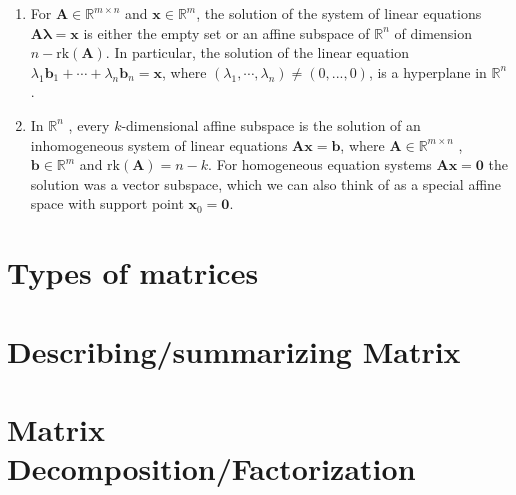 \begin{enumerate}
    \item For $\bm{A} \in \mathbb{R}^{m\times n}$ and $\bm{x} \in \mathbb{R}^m$, the solution of the system of linear equations $\bm{A} \bm{\lambda}  = \bm{x}$ is either the empty set or an affine subspace of $\mathbb{R}^n$ of dimension $n - \text{rk}(\bm{A})$. 
    In particular, the solution of the linear equation $\lambda _1 \bm{b}_1 + \cdots + \lambda _n \bm{b}_n = \bm{x}$, where $(\lambda _1, \cdots , \lambda _n) \neq (0, . . . , 0)$, is a hyperplane in $\mathbb{R}^n$ .
    \hfill \cite{mfml/book/mml/Deisenroth-Faisal-Ong}

    \item In $\mathbb{R}^n$ , every $k$-dimensional affine subspace is the solution of an inhomogeneous system of linear equations $\bm{Ax} = \bm{b}$, where $\bm{A} \in \mathbb{R}^{m\times n}$ , $\bm{b} \in \mathbb{R}^m$ and $\text{rk}(\bm{A}) = n - k$. 
    For homogeneous equation systems $\bm{Ax} = \bm{0}$ the solution was a vector subspace, which we can also think of as a special affine space with support point $\bm{x}_0 = \bm{0}$.
    \hfill \cite{mfml/book/mml/Deisenroth-Faisal-Ong}
\end{enumerate}

























\section{Types of matrices}













\section{Describing/summarizing Matrix}





\section{Matrix Decomposition/Factorization}

















